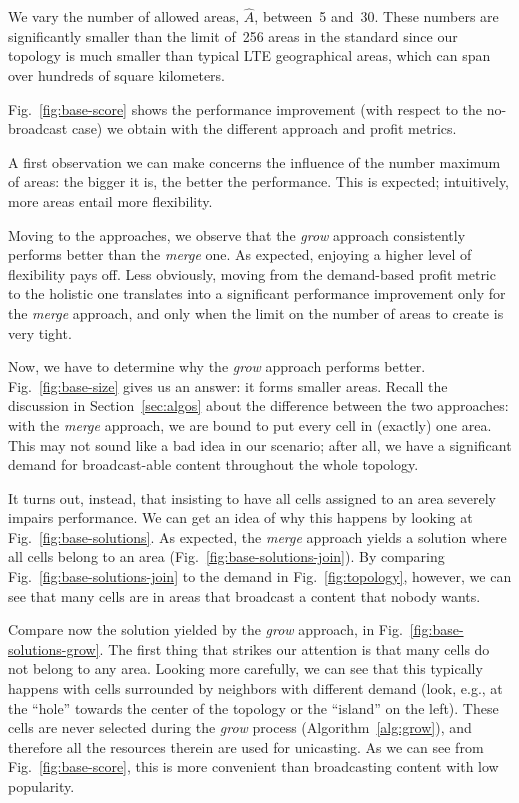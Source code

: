 \documentclass[10pt, conference, compsocconf]{IEEEtran}
\numberwithin{equation}{section}
\begin{document}
We vary the number of allowed areas, $\hat{A}$, between~5 and~30. These numbers are
significantly smaller than the limit of~256 areas in the
standard since our topology is much smaller than typical LTE
geographical areas, which can span over hundreds of square kilometers.

Fig.~\ref{fig:base-score} shows the performance improvement (with respect to
the no-broadcast case) we obtain with the different approach and profit
metrics.

A first observation we can make concerns the influence of the number
maximum of areas: the bigger it is, the better the performance. This is
expected; intuitively, more areas entail more flexibility. 


Moving to the approaches, we observe that the {\em grow} approach
consistently performs better than the {\em merge} one. As expected,
enjoying a higher level of flexibility pays off. Less obviously, moving
from the demand-based profit metric to the holistic one translates into
a significant performance improvement only for the {\em merge} approach,
and only when the limit on the number of areas to create is very tight.



Now, we have to determine why the {\em grow} approach performs better.
Fig.~\ref{fig:base-size} gives us an answer: it forms smaller areas.
Recall the discussion in Section~\ref{sec:algos} about the difference
between the two approaches: with the {\em merge} approach, we are bound
to put every cell in (exactly) one area. This may not sound like a bad idea
in our scenario; after all, we have a significant demand for
broadcast-able content throughout the whole topology.

It turns out, instead, that insisting to have all cells assigned to an
area severely impairs performance. We can get an idea of why this
happens by looking at Fig.~\ref{fig:base-solutions}. As expected, the
{\em merge} approach yields a solution where all cells belong to an area
(Fig.~\ref{fig:base-solutions-join}). By comparing
Fig.~\ref{fig:base-solutions-join} to the demand in
Fig.~\ref{fig:topology}, however, we can see that many cells are in
areas that broadcast a content that nobody wants. 


Compare now the solution yielded by the {\em grow} approach, in
Fig.~\ref{fig:base-solutions-grow}. The first thing that strikes our
attention is that many cells do not belong to any area. Looking more
carefully, we can see that this typically happens with cells surrounded
by neighbors with different demand (look, e.g., at the ``hole'' towards
the center of the topology or the ``island'' on the left). These cells are
never selected during the {\em grow} process (Algorithm~\ref{alg:grow}), and
therefore all the resources therein are used for unicasting. As we can
see from Fig.~\ref{fig:base-score}, this is more convenient than
broadcasting content with low popularity.
\end{document}
